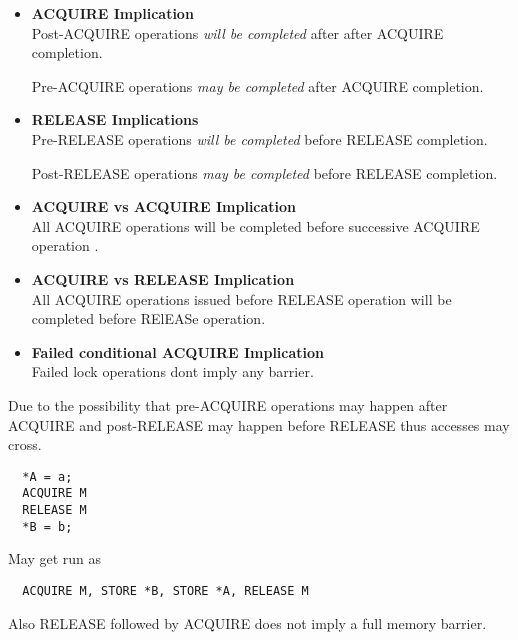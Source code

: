 \documentclass{article}
\begin{document}
\begin{itemize}
  
\item \textbf{ACQUIRE Implication} \\

  Post-ACQUIRE operations \emph{will be completed} after after ACQUIRE
  completion.

  Pre-ACQUIRE operations \emph{may be completed} after ACQUIRE
  completion.
  
\item \textbf{RELEASE Implications} \\

  Pre-RELEASE operations \emph{will be completed} before RELEASE
  completion.

  Post-RELEASE operations \emph{may be completed} before RELEASE
  completion.

\item \textbf{ACQUIRE vs ACQUIRE Implication} \\

  All ACQUIRE operations will be completed before successive ACQUIRE
  operation .

\item \textbf{ACQUIRE vs RELEASE Implication} \\

  All ACQUIRE operations issued before RELEASE operation will be
  completed before RElEASe operation.

\item \textbf{Failed conditional ACQUIRE Implication} \\

  Failed lock operations dont imply any barrier.
  
\end{itemize}

Due to the possibility that pre-ACQUIRE operations may happen after
ACQUIRE and post-RELEASE may happen before RELEASE thus accesses may
cross.

\begin{lstlisting}
  *A = a;
  ACQUIRE M
  RELEASE M
  *B = b;
\end{lstlisting}

May get run as

\begin{lstlisting}
  ACQUIRE M, STORE *B, STORE *A, RELEASE M
\end{lstlisting}

Also RELEASE followed by ACQUIRE does not imply a full memory barrier.
\end{document}
